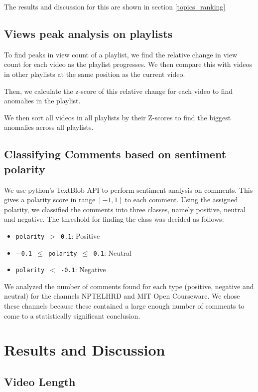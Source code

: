 \documentclass{article}
\begin{document}
 The results and discussion for this are shown in section \ref{topics_ranking}
\subsection{ Views peak analysis on playlists}
To find peaks in view count of a playlist, we find the relative change in view count for each video as the playlist progresses. We then compare this with videos in other playlists at the same position as the current video.

Then, we calculate the z-score of this relative change for each video to find anomalies in the playlist.

We then sort all videos in all playlists by their Z-scores to find the biggest anomalies across all playlists.


\subsection{Classifying Comments based on sentiment polarity}

We use python's TextBlob \cite{textblob} API to perform sentiment analysis on comments. This gives a polarity score in range $[-1,1]$ to each comment. Using the assigned polarity, we classified the comments into three classes, namely positive, neutral and negative. The threshold for finding the class was decided as follows:
\begin{itemize}
    \item \texttt{polarity $>$ 0.1}: Positive
    \item \texttt{$-$0.1 $\leq$ polarity $\leq$ 0.1}: Neutral
    \item \texttt{polarity $<$ -0.1}: Negative
\end{itemize}

We analyzed the number of comments found for each type (positive, negative and neutral) for the channels NPTELHRD  and MIT Open Courseware. We chose these channels because these contained a large enough number of comments to come to a statistically significant conclusion.


\section{Results and Discussion}
\subsection{Video Length}
\label{video_length}
\end{document}
